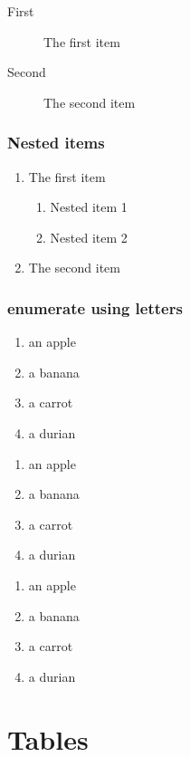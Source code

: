 \documentclass[12pt]{article}
\begin{document}
\begin{description}
\item[First] The first item
\item[Second] The second item
\end{description}

\subsubsection{Nested items}

\begin{enumerate}
  \item The first item
  \begin{enumerate}
    \item Nested item 1
    \item Nested item 2
  \end{enumerate}
  \item The second item
\end{enumerate}

\subsubsection{enumerate using letters}

\begin{enumerate}[label=(\alph*)]
\item an apple
\item a banana
\item a carrot
\item a durian
\end{enumerate}
\vspace{0.05\textheight}
\begin{enumerate}[label=(\Alph*)]
\item an apple
\item a banana
\item a carrot
\item a durian
\end{enumerate}
\vspace{0.05\textheight}
\begin{enumerate}[label=(\roman*)]
\item an apple
\item a banana
\item a carrot
\item a durian
\end{enumerate}

\newpage
\section{Tables}
\end{document}
